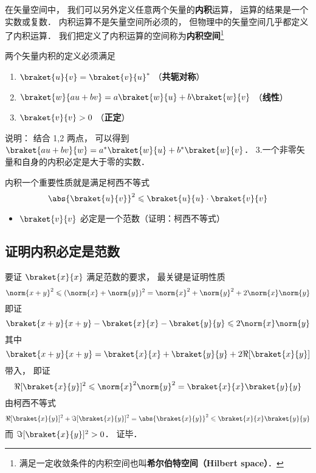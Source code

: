 

在矢量空间中， 我们可以另外定义任意两个矢量的\textbf{内积}运算， 运算的结果是一个实数或复数． 内积运算不是矢量空间所必须的， 但物理中的矢量空间几乎都定义了内积运算． 我们把定义了内积运算的空间称为\textbf{内积空间}\footnote{满足一定收敛条件的内积空间也叫\textbf{希尔伯特空间（Hilbert space）}．}%

两个矢量内积的定义必须满足
\begin{enumerate}
\item $\braket{u}{v} = \braket{v}{u}^*$ （\textbf{共轭对称}）
\item $\braket{w}{a u + b v} = a\braket{w}{u} + b\braket{w}{v}$ （\textbf{线性}）
\item $\braket{v}{v} > 0$ （\textbf{正定}）
\end{enumerate}

说明： 结合 1,2 两点， 可以得到 $\braket{a u + b v}{w} = a^*\braket{w}{u} + b^*\braket{w}{v}$．
3.一个非零矢量和自身的内积必定是大于零的实数．

内积一个重要性质就是满足柯西不等式
\begin{equation}
\abs{\braket{u}{v}}^2 \leqslant \braket{u}{u} \cdot \braket{v}{v}
\end{equation}

\begin{itemize}
\item $\braket{v}{v}$ 必定是一个范数（证明：柯西不等式）
\end{itemize}

\subsection{证明内积必定是范数}
要证 $\braket{x}{x}$ 满足范数的要求， 最关键是证明性质
\begin{equation}
\norm{x+y}^2 \leqslant (\norm{x} + \norm{y})^2 = \norm{x}^2 + \norm{y}^2 + 2\norm{x}\norm{y}
\end{equation}
即证
\begin{equation}
\braket{x+y}{x+y} - \braket{x}{x} - \braket{y}{y} \leqslant 2\norm{x}\norm{y}
\end{equation}
其中
\begin{equation}
\braket{x+y}{x+y} = \braket{x}{x} + \braket{y}{y} + 2\Re[{\braket{x}{y}}]
\end{equation}
带入， 即证
\begin{equation}
\Re[{\braket{x}{y}}]^2 \leqslant \norm{x}^2\norm{y}^2 = \braket{x}{x}\braket{y}{y}
\end{equation}
由柯西不等式
\begin{equation}
\Re[\braket{x}{y}]^2 + \Im[\braket{x}{y}]^2 = \abs{\braket{x}{y}}^2 \leqslant \braket{x}{x}\braket{y}{y}
\end{equation}
而 $\Im[\braket{x}{y}]^2 > 0$． 证毕．
